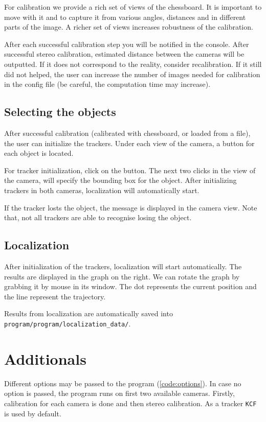 For calibration we provide a rich set of views of the chessboard. It is important
to move with it and to capture it from various angles, distances and in different
parts of the image. A richer set of views increases robustness of the calibration.

After each successful calibration step you will be notified in the console.
After successful stereo calibration, estimated distance between the cameras
will be outputted. If it does not correspond to the reality, consider
recalibration. If it still did not helped, the user can increase the number of
images needed for calibration in the config file (be careful, the computation
time may increase).

\subsection{Selecting the objects}
After successful calibration (calibrated with chessboard, or loaded from a
file), the user can initialize the trackers. Under each view of the camera, a button
for each object is located.

For tracker initialization, click on the button. The next two clicks in the
view of the camera, will specify the bounding box for the object. After
initializing trackers in both cameras, localization will automatically start.

If the tracker losts the object, the message is displayed in the camera
view. Note that, not all trackers are able to recognise losing the object.

\subsection{Localization}
After initialization of the trackers, localization will start automatically.
The results are displayed in the graph on the right. We can rotate the graph by
grabbing it by mouse in its window. The dot represents the current position and
the line represent the trajectory.

Results from localization are automatically saved into
\verb+program/program/localization_data/+.

\section{Additionals}

Different options may be passed to the program (\ref{code:options}). In case no option
is passed, the program runs on first two available cameras. Firstly, calibration for
each camera is done and then stereo calibration. As a tracker \verb+KCF+ is used by default.

